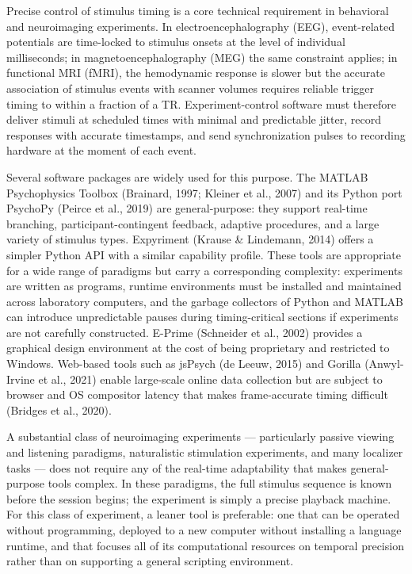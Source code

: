 \documentclass[
  11pt,
]{article}
\begin{document}
Precise control of stimulus timing is a core technical requirement in
behavioral and neuroimaging experiments. In electroencephalography
(EEG), event-related potentials are time-locked to stimulus onsets at
the level of individual milliseconds; in magnetoencephalography (MEG)
the same constraint applies; in functional MRI (fMRI), the hemodynamic
response is slower but the accurate association of stimulus events with
scanner volumes requires reliable trigger timing to within a fraction of
a TR. Experiment-control software must therefore deliver stimuli at
scheduled times with minimal and predictable jitter, record responses
with accurate timestamps, and send synchronization pulses to recording
hardware at the moment of each event.

Several software packages are widely used for this purpose. The MATLAB
Psychophysics Toolbox (Brainard, 1997; Kleiner et al., 2007) and its
Python port PsychoPy (Peirce et al., 2019) are general-purpose: they
support real-time branching, participant-contingent feedback, adaptive
procedures, and a large variety of stimulus types. Expyriment (Krause \&
Lindemann, 2014) offers a simpler Python API with a similar capability
profile. These tools are appropriate for a wide range of paradigms but
carry a corresponding complexity: experiments are written as programs,
runtime environments must be installed and maintained across laboratory
computers, and the garbage collectors of Python and MATLAB can introduce
unpredictable pauses during timing-critical sections if experiments are
not carefully constructed. E-Prime (Schneider et al., 2002) provides a
graphical design environment at the cost of being proprietary and
restricted to Windows. Web-based tools such as jsPsych (de Leeuw, 2015)
and Gorilla (Anwyl-Irvine et al., 2021) enable large-scale online data
collection but are subject to browser and OS compositor latency that
makes frame-accurate timing difficult (Bridges et al., 2020).

A substantial class of neuroimaging experiments --- particularly passive
viewing and listening paradigms, naturalistic stimulation experiments,
and many localizer tasks --- does not require any of the real-time
adaptability that makes general-purpose tools complex. In these
paradigms, the full stimulus sequence is known before the session
begins; the experiment is simply a precise playback machine. For this
class of experiment, a leaner tool is preferable: one that can be
operated without programming, deployed to a new computer without
installing a language runtime, and that focuses all of its computational
resources on temporal precision rather than on supporting a general
scripting environment.
\end{document}
